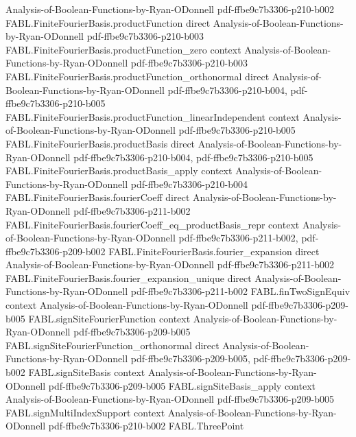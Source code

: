 \begin{theorem}
  {Analysis-of-Boolean-Functions-by-Ryan-ODonnell}
  {pdf-ffbe9c7b3306-p210-b002}
\proofstep
  {FABL.FiniteFourierBasis.productFunction}
  {direct}
  {Analysis-of-Boolean-Functions-by-Ryan-ODonnell}
  {pdf-ffbe9c7b3306-p210-b003}
\proofstep
  {FABL.FiniteFourierBasis.productFunction_zero}
  {context}
  {Analysis-of-Boolean-Functions-by-Ryan-ODonnell}
  {pdf-ffbe9c7b3306-p210-b003}
\proofstep
  {FABL.FiniteFourierBasis.productFunction_orthonormal}
  {direct}
  {Analysis-of-Boolean-Functions-by-Ryan-ODonnell}
  {pdf-ffbe9c7b3306-p210-b004,
    pdf-ffbe9c7b3306-p210-b005}
\proofstep
  {FABL.FiniteFourierBasis.productFunction_linearIndependent}
  {context}
  {Analysis-of-Boolean-Functions-by-Ryan-ODonnell}
  {pdf-ffbe9c7b3306-p210-b005}
\proofstep
  {FABL.FiniteFourierBasis.productBasis}
  {direct}
  {Analysis-of-Boolean-Functions-by-Ryan-ODonnell}
  {pdf-ffbe9c7b3306-p210-b004,
    pdf-ffbe9c7b3306-p210-b005}
\proofstep
  {FABL.FiniteFourierBasis.productBasis_apply}
  {context}
  {Analysis-of-Boolean-Functions-by-Ryan-ODonnell}
  {pdf-ffbe9c7b3306-p210-b004}
\proofstep
  {FABL.FiniteFourierBasis.fourierCoeff}
  {direct}
  {Analysis-of-Boolean-Functions-by-Ryan-ODonnell}
  {pdf-ffbe9c7b3306-p211-b002}
\proofstep
  {FABL.FiniteFourierBasis.fourierCoeff_eq_productBasis_repr}
  {context}
  {Analysis-of-Boolean-Functions-by-Ryan-ODonnell}
  {pdf-ffbe9c7b3306-p211-b002,
    pdf-ffbe9c7b3306-p209-b002}
\proofstep
  {FABL.FiniteFourierBasis.fourier_expansion}
  {direct}
  {Analysis-of-Boolean-Functions-by-Ryan-ODonnell}
  {pdf-ffbe9c7b3306-p211-b002}
\proofstep
  {FABL.FiniteFourierBasis.fourier_expansion_unique}
  {direct}
  {Analysis-of-Boolean-Functions-by-Ryan-ODonnell}
  {pdf-ffbe9c7b3306-p211-b002}
\proofstep
  {FABL.finTwoSignEquiv}
  {context}
  {Analysis-of-Boolean-Functions-by-Ryan-ODonnell}
  {pdf-ffbe9c7b3306-p209-b005}
\proofstep
  {FABL.signSiteFourierFunction}
  {context}
  {Analysis-of-Boolean-Functions-by-Ryan-ODonnell}
  {pdf-ffbe9c7b3306-p209-b005}
\proofstep
  {FABL.signSiteFourierFunction_orthonormal}
  {direct}
  {Analysis-of-Boolean-Functions-by-Ryan-ODonnell}
  {pdf-ffbe9c7b3306-p209-b005,
    pdf-ffbe9c7b3306-p209-b002}
\proofstep
  {FABL.signSiteBasis}
  {context}
  {Analysis-of-Boolean-Functions-by-Ryan-ODonnell}
  {pdf-ffbe9c7b3306-p209-b005}
\proofstep
  {FABL.signSiteBasis_apply}
  {context}
  {Analysis-of-Boolean-Functions-by-Ryan-ODonnell}
  {pdf-ffbe9c7b3306-p209-b005}
\proofstep
  {FABL.signMultiIndexSupport}
  {context}
  {Analysis-of-Boolean-Functions-by-Ryan-ODonnell}
  {pdf-ffbe9c7b3306-p210-b002}
\proofstep
  {FABL.ThreePoint}

\end{theorem}
